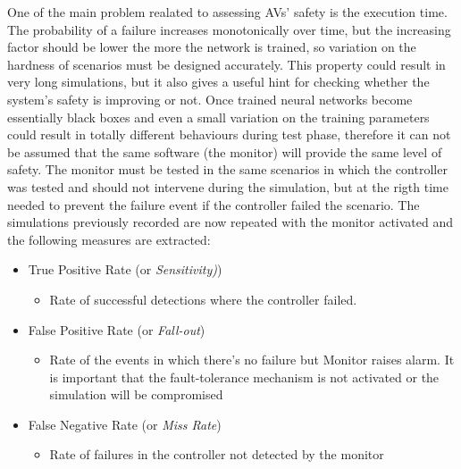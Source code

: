 One of the main problem realated to assessing AVs' safety is the execution time. The probability of a failure increases monotonically over time, but the increasing factor should be lower the more the network is trained, so variation on the hardness of scenarios must be designed accurately. This property could result in very long simulations, but it also gives a useful hint for checking whether the system's safety is improving or not. \newline\newline
Once trained neural networks become essentially black boxes and even a small variation on the training parameters could result in totally different behaviours during test phase, therefore it can not be assumed that the same software (the monitor) will provide the same level of safety.\newline
The monitor must be tested in the same scenarios in which the controller was tested and should not intervene during the simulation, but at the rigth time needed to prevent the failure event if the controller failed the scenario. The simulations previously recorded are now repeated with the monitor activated and the following measures are extracted:

\begin{itemize}
	\item True Positive Rate (or \textsl{Sensitivity)})
	\begin{itemize}
		\item Rate of successful detections where the controller failed.
	\end{itemize}
	\item False Positive Rate (or \textsl{Fall-out})
	\begin{itemize}
		\item Rate of the events in which there's no failure but Monitor raises alarm. It is important that the fault-tolerance mechanism is not activated or the simulation will be compromised
	\end{itemize}
	\item False Negative Rate (or \textsl{Miss Rate})
	\begin{itemize}
		\item Rate of failures in the controller not detected by the monitor
	\end{itemize}
\end{itemize}

